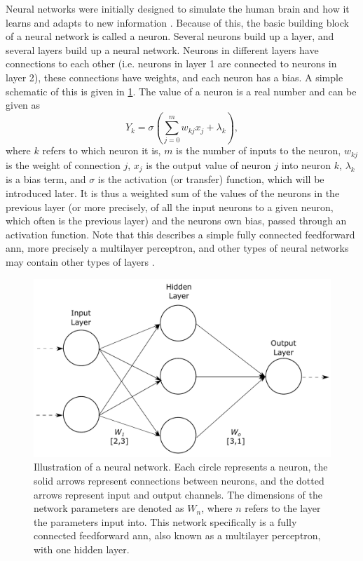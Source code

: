 Neural networks were initially designed to simulate the human brain and how it learns and adapts to new information \cite{McCulloch1943}. Because of this, the basic building block of a neural network is called a neuron. Several neurons build up a layer, and several layers build up a neural network. Neurons in different layers have connections to each other (i.e. neurons in layer 1 are connected to neurons in layer 2), these connections have weights, and each neuron has a bias. A simple schematic of this is given in \cref{fig:neuralnetwork}. The value of a neuron is a real number and can be given as \cite[81]{Wang2003}
\begin{equation}
    \label{eq:neuron}
    Y_{k} = \sigma\left(\sum_{j=0}^{m}w_{kj}x_j + \lambda_k \right),
\end{equation}
where $k$ refers to which neuron it is, $m$ is the number of inputs to the neuron, $w_{kj}$ is the weight of connection $j$, $x_j$ is the output value of neuron $j$ into neuron $k$, $\lambda_k$ is a bias term, and $\sigma$ is the activation (or transfer) function, which will be introduced later. It is thus a weighted sum of the values of the neurons in the previous layer (or more precisely, of all the input neurons to a given neuron, which often is the previous layer) and the neurons own bias, passed through an activation function. Note that this describes a simple fully connected feedforward \gls{ann}, more precisely a multilayer perceptron, and other types of neural networks may contain other types of layers \cite{Wang2003}. 

\begin{figure}[htbp]  
    \centering
    \includegraphics[width=.8\textwidth]{figures/neuralnetwork.pdf}
    \caption[Illustration of a neural network]{Illustration of a neural network. Each circle represents a neuron, the solid arrows represent connections between neurons, and the dotted arrows represent input and output channels. The dimensions of the network parameters are denoted as $W_n$, where $n$ refers to the layer the parameters input into. This network specifically is a fully connected feedforward \gls{ann}, also known as a multilayer perceptron, with one hidden layer. }
    \label{fig:neuralnetwork}
\end{figure}

